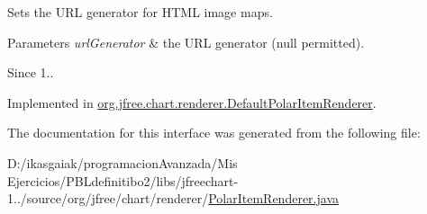 Sets the U\+RL generator for H\+T\+ML image maps.


\begin{DoxyParams}{Parameters}
{\em url\+Generator} & the U\+RL generator (null permitted).\\
\hline
\end{DoxyParams}
\begin{DoxySince}{Since}
1.. 
\end{DoxySince}


Implemented in \mbox{\hyperlink{classorg_1_1jfree_1_1chart_1_1renderer_1_1_default_polar_item_renderer_a9a49fc33df2e4f9e3050dcbff3a03ead}{org.\+jfree.\+chart.\+renderer.\+Default\+Polar\+Item\+Renderer}}.



The documentation for this interface was generated from the following file\+:\begin{DoxyCompactItemize}
\item 
D\+:/ikasgaiak/programacion\+Avanzada/\+Mis Ejercicios/\+P\+B\+Ldefinitibo2/libs/jfreechart-\/1../source/org/jfree/chart/renderer/\mbox{\hyperlink{_polar_item_renderer_8java}{Polar\+Item\+Renderer.\+java}}\end{DoxyCompactItemize}
